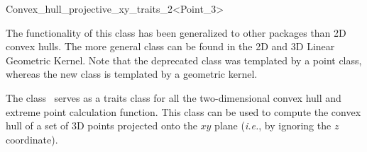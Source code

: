
\ccAutoIndexingOff
\begin{ccRefClass}{Convex_hull_projective_xy_traits_2<Point_3>}
\ccAutoIndexingOn
{}


\begin{ccDeprecated}
The functionality of this class has been generalized to other packages than 2D convex hulls.
The more general class  can be found in the 2D and 3D Linear Geometric Kernel.
Note that the deprecated class was templated by a point class, whereas the new class
is templated by a geometric kernel.
\end{ccDeprecated}

\ccDefinition
  
The class \ccRefName\ serves as a traits class for all the two-dimensional
convex hull and extreme point calculation function.   This class can be
used to compute the convex hull of a set of 3D points projected onto the
$xy$ plane (\textit{i.e.}, by ignoring the $z$ coordinate).


\ccIsModel

%
 \\

\ccTypes

\ccAutoIndexingOff
{}
\ccThreeToTwo

\ccGlue
{}
\ccGlue
{}
\ccGlue
{}
\ccGlue
{}
\ccGlue
{}
\ccGlue
{}


\end{ccRefClass}
